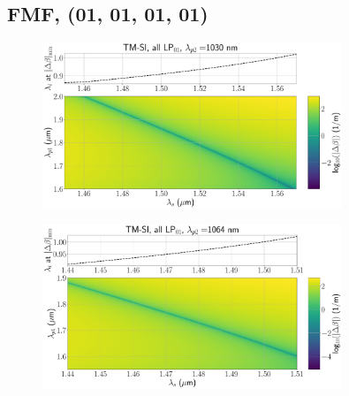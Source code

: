 \documentclass[11pt, headings=optiontoheadandtoc]{article}
\begin{document}
\subsection{FMF, (01, 01, 01, 01)}
\begin{figure}[h]
    \centering
    \includegraphics[width=0.8\textwidth]{./figs/TMSI_all_LP01_1030_2d_dbeta.pdf}
    \caption{}
    \label{fig:fmf_1030}
\end{figure}
\begin{figure}[h]
    \centering
    \includegraphics[width=0.8\textwidth]{./figs/TMSI_all_LP01_1064_2d_dbeta.pdf}
    \caption{}
    \label{fig:fmf_1064}
\end{figure}
\end{document}
